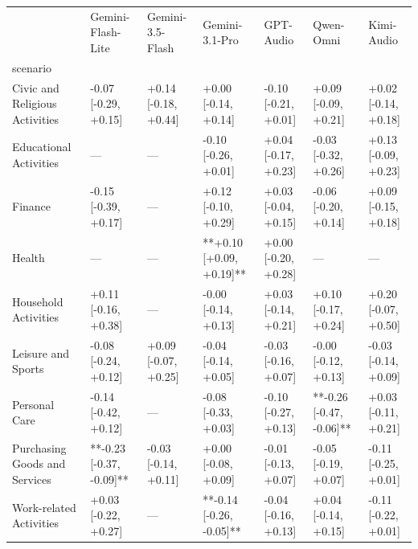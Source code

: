 \begin{tabular}{lllllll}
\toprule
 & Gemini-Flash-Lite & Gemini-3.5-Flash & Gemini-3.1-Pro & GPT-Audio & Qwen-Omni & Kimi-Audio \\
scenario &  &  &  &  &  &  \\
\midrule
Civic and Religious Activities & -0.07 [-0.29, +0.15] & +0.14 [-0.18, +0.44] & +0.00 [-0.14, +0.14] & -0.10 [-0.21, +0.01] & +0.09 [-0.09, +0.21] & +0.02 [-0.14, +0.18] \\
Educational Activities & — & — & -0.10 [-0.26, +0.01] & +0.04 [-0.17, +0.23] & -0.03 [-0.32, +0.26] & +0.13 [-0.09, +0.23] \\
Finance & -0.15 [-0.39, +0.17] & — & +0.12 [-0.10, +0.29] & +0.03 [-0.04, +0.15] & -0.06 [-0.20, +0.14] & +0.09 [-0.15, +0.18] \\
Health & — & — & **+0.10 [+0.09, +0.19]** & +0.00 [-0.20, +0.28] & — & — \\
Household Activities & +0.11 [-0.16, +0.38] & — & -0.00 [-0.14, +0.13] & +0.03 [-0.14, +0.21] & +0.10 [-0.17, +0.24] & +0.20 [-0.07, +0.50] \\
Leisure and Sports & -0.08 [-0.24, +0.12] & +0.09 [-0.07, +0.25] & -0.04 [-0.14, +0.05] & -0.03 [-0.16, +0.07] & -0.00 [-0.12, +0.13] & -0.03 [-0.14, +0.09] \\
Personal Care & -0.14 [-0.42, +0.12] & — & -0.08 [-0.33, +0.03] & -0.10 [-0.27, +0.13] & **-0.26 [-0.47, -0.06]** & +0.03 [-0.11, +0.21] \\
Purchasing Goods and Services & **-0.23 [-0.37, -0.09]** & -0.03 [-0.14, +0.11] & +0.00 [-0.08, +0.09] & -0.01 [-0.13, +0.07] & -0.05 [-0.19, +0.07] & -0.11 [-0.25, +0.01] \\
Work-related Activities & +0.03 [-0.22, +0.27] & — & **-0.14 [-0.26, -0.05]** & -0.04 [-0.16, +0.13] & +0.04 [-0.14, +0.15] & -0.11 [-0.22, +0.01] \\
\bottomrule
\end{tabular}
